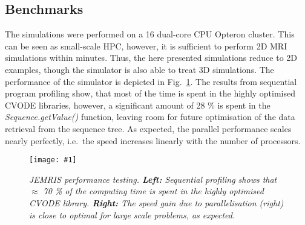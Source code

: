 \documentclass{nic-series}
\newcommand{\epsfigure}[5]{
 \begin{figure}[#4!]
   \begin{center}
    \texttt{[image: \#1]}
    \caption{{\sl #2}\label{#3}}
   \end{center}
 \end{figure}}
\begin{document}
\subsection{Benchmarks}
The simulations were performed on a 16 dual-core CPU Opteron cluster. This can be seen as small-scale HPC, however, it is sufficient
to perform 2D MRI simulations within minutes. Thus, the here presented simulations reduce to 2D examples, though the simulator
is also able to treat 3D simulations. The performance of the simulator is depicted in Fig.~\ref{fig:performance}. The results from
sequential program profiling show, that most of the time is spent in the highly optimised CVODE libraries, however, a significant
amount of 28 \% is spent in the {\it Sequence.getValue()} function, leaving room for future optimisation of the data retrieval from
the sequence tree. As expected, the parallel performance scales nearly perfectly, i.e.~the speed increases linearly with the number
of processors.
\epsfigure{fig/performance.eps}{JEMRIS performance testing. {\bf Left:} Sequential profiling shows that $\approx$ 70 \% of the computing time
                             is spent in the highly optimised CVODE library. {\bf Right:} The speed
			     gain due to parallelisation (right) is close to optimal for large scale problems, as expected.}
			{fig:performance}{bp}{1.0}
\end{document}
